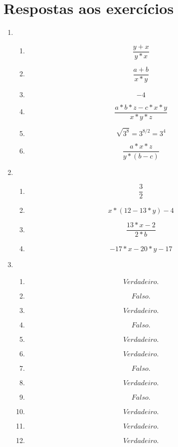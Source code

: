\documentclass[12pt]{article}
\begin{document}
\newpage

\section{Respostas aos exercícios}
\begin{enumerate}
	\item
	\begin{enumerate}
		\item $$\frac{y+x}{y*x}$$
		\item $$\frac{a+b}{x*y}$$
		\item $$-4$$
		\item $$\frac{a*b*z-c*x*y}{x*y*z}$$
		\item $$\sqrt{3^8} = 3^{8/2} = 3^4$$
		\item $$\frac{a*x*z}{y*(b-c)}$$
	\end{enumerate}	

	\item
	\begin{enumerate}
		\item $$\frac{3}{2}$$
		\item $$x*(12 - 13*y) - 4$$
		\item $$\frac{13*x-2}{2*b}$$
		\item $$-17*x -20*y - 17$$
	\end{enumerate}

	\item
	\begin{enumerate}
		\item $$Verdadeiro.$$
		\item $$Falso.$$
		\item $$Verdadeiro.$$
		\item $$Falso.$$
		\item $$Verdadeiro.$$
		\item $$Verdadeiro.$$
		\item $$Falso.$$
		\item $$Verdadeiro.$$
		\item $$Falso.$$
		\item $$Verdadeiro.$$
		\item $$Verdadeiro.$$
		\item $$Verdadeiro.$$
	\end{enumerate}
\end{enumerate}
\end{document}
